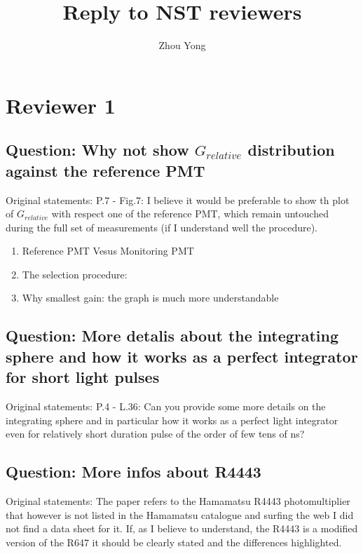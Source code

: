 \documentclass[]{article}
\title{Reply to NST reviewers}
\author{Zhou Yong}
\begin{document}
\maketitle

\begin{abstract}

\end{abstract}

\section{Reviewer 1}
\subsection{Question: Why not show $G_{relative}$ distribution against the reference PMT}
Original statements: P.7 - Fig.7: I believe it would be preferable to show th plot of $G_{relative}$ with respect one of the reference PMT, which remain untouched during the full set of measurements (if I understand well the procedure). 

\begin{enumerate}
	\item Reference PMT Vesus Monitoring PMT
	\item The selection procedure: 
	\item Why smallest gain: the graph is much more understandable
\end{enumerate}

\subsection{Question: More detalis about the integrating sphere and how it works as a perfect integrator for short light pulses}
Original statements: P.4 - L.36: Can you provide some more details on the integrating sphere and in particular how it works as a perfect light integrator even for relatively short duration pulse of the order of few tens of ns?

\subsection{Question: More infos about R4443}
Original statements: The paper refers to the Hamamatsu R4443 photomultiplier that however is not listed in the Hamamatsu catalogue and surfing the web I did not find a data sheet for it. If, as I believe to understand, the R4443 is a modified version of the R647 it should be clearly stated and the differences highlighted.
\end{document}
